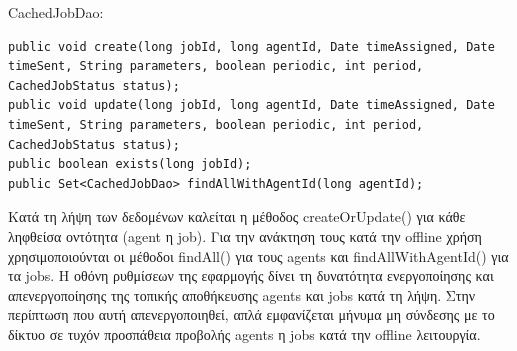 \documentclass[a4paper,11pt]{article}
\begin{document}
\begin{sloppypar}
CachedJobDao:

\begin{lstlisting}
public void create(long jobId, long agentId, Date timeAssigned, Date timeSent, String parameters, boolean periodic, int period, CachedJobStatus status);
public void update(long jobId, long agentId, Date timeAssigned, Date timeSent, String parameters, boolean periodic, int period, CachedJobStatus status);
public boolean exists(long jobId);
public Set<CachedJobDao> findAllWithAgentId(long agentId);
\end{lstlisting}

Κατά τη λήψη των δεδομένων καλείται η μέθοδος createOrUpdate() για κάθε ληφθείσα οντότητα (agent η job). Για την ανάκτηση τους κατά την offline χρήση χρησιμοποιούνται οι μέθοδοι findAll() για τους agents και findAllWithAgentId() για τα jobs. Η οθόνη ρυθμίσεων της εφαρμογής δίνει τη δυνατότητα ενεργοποίησης και απενεργοποίησης της τοπικής αποθήκευσης agents και jobs κατά τη λήψη. Στην περίπτωση που αυτή απενεργοποιηθεί, απλά εμφανίζεται μήνυμα μη σύνδεσης με το δίκτυο σε τυχόν προσπάθεια προβολής agents η jobs κατά την offline λειτουργία.

\newpage



\end{sloppypar}
\end{document}

